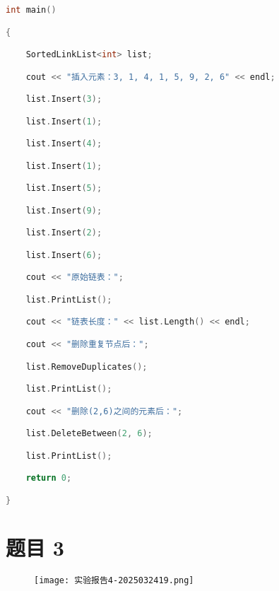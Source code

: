 \begin{lstlisting}[language=C++]
int main()

{

    SortedLinkList<int> list;

    cout << "插入元素：3, 1, 4, 1, 5, 9, 2, 6" << endl;

    list.Insert(3);

    list.Insert(1);

    list.Insert(4);

    list.Insert(1);

    list.Insert(5);

    list.Insert(9);

    list.Insert(2);

    list.Insert(6);

    cout << "原始链表：";

    list.PrintList();

    cout << "链表长度：" << list.Length() << endl;

    cout << "删除重复节点后：";

    list.RemoveDuplicates();

    list.PrintList();

    cout << "删除(2,6)之间的元素后：";

    list.DeleteBetween(2, 6);

    list.PrintList();

    return 0;

}
\end{lstlisting}
\section{题目 3}

\begin{figure}[H]
\centering
\texttt{[image: 实验报告4-2025032419.png]}
\label{}
\end{figure}

